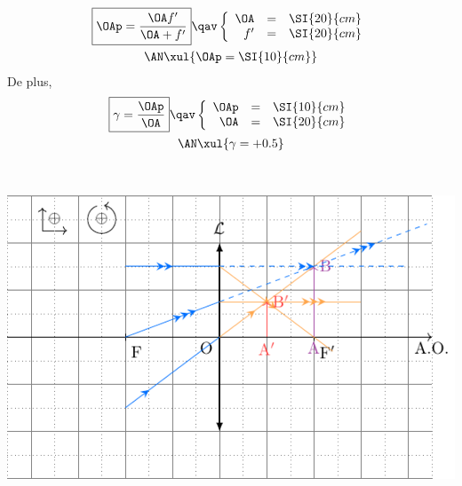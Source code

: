 \documentclass[a4paper, 10pt, garamond, oneside]{book}
\begin{document}
{\begin{enumerate}
\begin{minipage}[t]{.48\linewidth}
			      \begin{gather*}
				      \boxed{\OAp = \frac{\OA f'}{\OA+f'}}
				      \qav
				      \left\{
				      \begin{array}{rcl}
					      \OA & = & \SI{20}{cm}
					      \\
					      f'  & = & \SI{20}{cm}
				      \end{array}
				      \right.\\
				      \AN
				      \xul{
					      \OAp = \SI{10}{cm}
				      }
			      \end{gather*}
			      De plus,
			      \begin{gather*}
				      \boxed{\gamma = \frac{\OAp}{\OA}}
				      \qav
				      \left\{
				      \begin{array}{rcl}
					      \OAp & = & \SI{10}{cm}
					      \\
					      \OA  & = & \SI{20}{cm}
				      \end{array}
				      \right.\\
				      \AN
				      \xul{
					      \gamma = +0.5
				      }
			      \end{gather*}
		      \end{minipage}
		      \hfill
		      \begin{minipage}[t]{.48\linewidth}
			      ~
			      \begin{center}
				      \includegraphics[width=\linewidth]{convDF}
			      \end{center}
		      \end{minipage}
	\end{enumerate}
}
\end{document}

